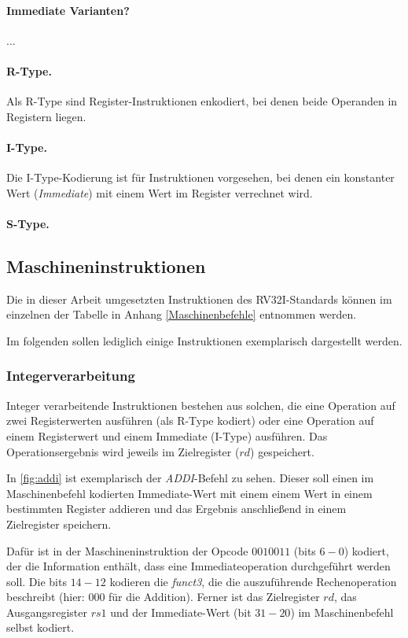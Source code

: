\paragraph{Immediate Varianten?}
...

\paragraph{R-Type.} Als R-Type sind Register-Instruktionen enkodiert, bei denen beide Operanden in Registern liegen.

\paragraph{I-Type.} Die I-Type-Kodierung ist für Instruktionen vorgesehen, bei denen ein konstanter Wert (\textit{Immediate}) mit einem Wert im Register verrechnet wird.

\paragraph{S-Type.}

\subsection{Maschineninstruktionen}
Die in dieser Arbeit umgesetzten Instruktionen des RV32I-Standards können im einzelnen der Tabelle in Anhang \ref{Maschinenbefehle} entnommen werden.

Im folgenden sollen lediglich einige Instruktionen exemplarisch dargestellt werden.

\subsubsection{Integerverarbeitung}
Integer verarbeitende Instruktionen bestehen aus solchen, die eine Operation auf zwei Registerwerten ausführen (als R-Type kodiert) oder eine Operation auf einem Registerwert und einem Immediate (I-Type) ausführen. Das Operationsergebnis wird jeweils im Zielregister ($rd$) gespeichert.

In \ref{fig:addi} ist exemplarisch der \textit{ADDI}-Befehl zu sehen. Dieser soll einen im Maschinenbefehl kodierten Immediate-Wert mit einem einem Wert in einem bestimmten Register addieren und das Ergebnis anschließend in einem Zielregister speichern.
 
Dafür ist in der Maschineninstruktion der Opcode $0010011$ (bits $6 - 0$) kodiert, der die Information enthält, dass eine Immediateoperation durchgeführt werden soll. Die bits $14-12$ kodieren die \textit{funct3}, die die auszuführende Rechenoperation beschreibt (hier: $000$ für die Addition). Ferner ist das Zielregister $rd$, das Ausgangsregister $rs1$ und der Immediate-Wert (bit $31 - 20$) im Maschinenbefehl selbst kodiert.


